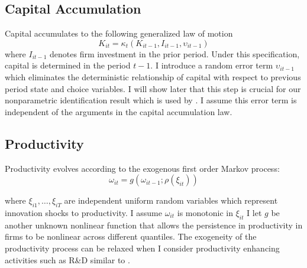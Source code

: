 \documentclass{article}
\begin{document}
\subsection*{Capital Accumulation}
Capital accumulates to the following generalized law of motion
\begin{equation} \label{modelK}
K_{it}=\kappa_{t}(K_{it-1}, I_{it-1}, \upsilon_{it-1})
\end{equation}
where $I_{it-1}$ denotes firm investment in the prior period. Under this specification, capital is determined in the period $t-1$. I introduce a random error term $\upsilon_{it-1}$ which eliminates the deterministic relationship of capital with respect to previous period state and choice variables. I will show later that this step is crucial for our nonparametric identification result which is used by \cite{Hu2019}. I assume this error term is independent of the arguments in the capital accumulation law.

\subsection*{Productivity}
Productivity evolves according to the exogenous first order Markov process:
\begin{equation}\label{modelw}
\omega_{it}=g(\omega_{it-1}; \rho(\xi_{it}))
\end{equation}

where $\xi_{i1},\dots, \xi_{iT}$ are independent uniform random variables which represent innovation shocks to productivity. I assume $\omega_{it}$ is monotonic in $\xi_{it}$ I let $g$ be another unknown nonlinear function that allows the persistence in productivity in firms to be nonlinear across different quantiles. The exogeneity of the productivity process can be relaxed when I consider productivity enhancing activities such as R\&D similar to \cite{Doraszelski2013}.
\end{document}
